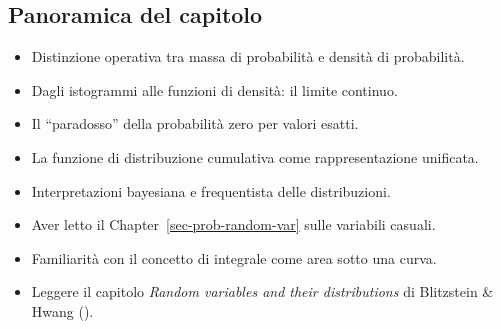 \documentclass[
  letterpaper,
  DIV=11,
  numbers=noendperiod,
  oneside]{scrreprt}
\providecommand{\tightlist}{%
  \setlength{\itemsep}{0pt}\setlength{\parskip}{0pt}}
\theoremstyle{definition}
\theoremstyle{plain}
\theoremstyle{definition}
\theoremstyle{remark}
\begin{document}
\subsection*{Panoramica del capitolo}\label{panoramica-del-capitolo-6}

\begin{itemize}
\tightlist
\item
  Distinzione operativa tra massa di probabilità e densità di
  probabilità.
\item
  Dagli istogrammi alle funzioni di densità: il limite continuo.
\item
  Il ``paradosso'' della probabilità zero per valori esatti.
\item
  La funzione di distribuzione cumulativa come rappresentazione
  unificata.
\item
  Interpretazioni bayesiana e frequentista delle distribuzioni.
\end{itemize}

\begin{tcolorbox}[enhanced jigsaw, arc=.35mm, breakable, colbacktitle=quarto-callout-tip-color!10!white, opacityback=0, toprule=.15mm, rightrule=.15mm, colback=white, opacitybacktitle=0.6, leftrule=.75mm, coltitle=black, bottomtitle=1mm, left=2mm, toptitle=1mm, title=\textcolor{quarto-callout-tip-color}{\faLightbulb}\hspace{0.5em}{Prerequisiti}, titlerule=0mm, bottomrule=.15mm, colframe=quarto-callout-tip-color-frame]

\begin{itemize}
\tightlist
\item
  Aver letto il Chapter~\ref{sec-prob-random-var} sulle variabili
  casuali.
\item
  Familiarità con il concetto di integrale come area sotto una curva.
\item
  Leggere il capitolo \emph{Random variables and their distributions} di
  Blitzstein \& Hwang ().
\end{itemize}

\end{tcolorbox}
\end{document}

